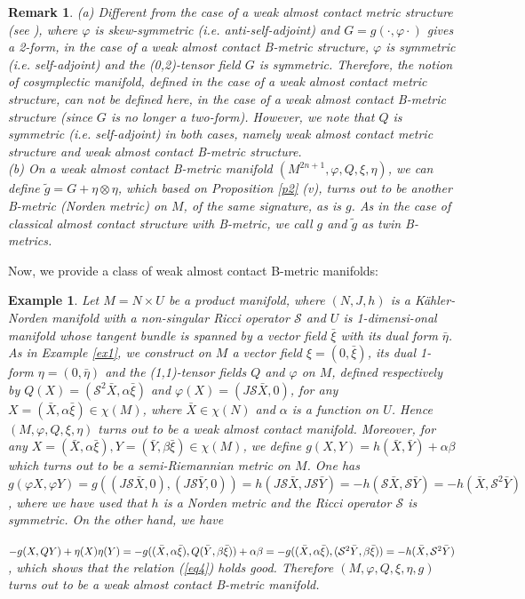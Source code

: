 \documentclass{article}
\newtheorem{example}[theorem]{Example}
\newtheorem{remark}[theorem]{Remark}
\begin{document}
\begin{remark}
(a)	Different from the case of a weak almost contact metric structure (see \cite{Rovenski1}), where $\varphi$ is skew-symmetric (i.e. anti-self-adjoint) and $G = g(·, \varphi·)$ gives a 2-form, in the case of a weak almost contact B-metric structure, $\varphi$  is symmetric (i.e. self-adjoint) and the (0,2)-tensor field $G$ is symmetric. Therefore, the notion of cosymplectic manifold, defined in the case of a weak almost contact metric structure, can not be defined here, in the case of a weak almost contact B-metric structure (since $G$ is no longer a two-form). However, we note that $Q$ is symmetric (i.e. self-adjoint) in both cases, namely weak almost contact metric structure and weak almost contact B-metric structure.\\

(b) On a weak almost contact B-metric manifold $(M^{2n+1},\varphi,Q,\xi,\eta)$, we can define $\tilde{g}=G+\eta\otimes \eta$, which based on Proposition \ref{p2} (v), turns out to be another B-metric (Norden metric) on $M$, of the same signature, as is $g$. As in the case of classical almost contact  structure with B-metric, we call $g$ and $\tilde{g}$ as twin B-metrics.
\end{remark}

\noindent Now, we provide a class of weak almost contact B-metric manifolds:

\begin{example}
Let $M=N\times U$ be a product manifold, where $(N,J,h)$ is a K\"{a}hler-Norden manifold with a non-singular Ricci operator $\mathcal{S}$ and $U$ is 1-dimensi-onal manifold whose tangent bundle is spanned by a vector field ${\bar{\xi}}$ with its dual form $\bar{\eta}$. As in Example \ref{ex1}, we construct on $M$ a vector field $\xi=(0,\bar{\xi})$, its dual 1-form $\eta=(0,\bar{\eta})$ and the (1,1)-tensor fields $Q$ and $\varphi$ on $M$, defined respectively by $Q (X)=(\mathcal{S}^2\bar{X},\alpha\bar{\xi})$ and $\varphi (X)=(J\mathcal{S}\bar{X},0)$, for any $X=(\bar{X},\alpha\bar{\xi})\in\chi(M)$,  where $\bar{X}\in\chi(N)$ and $\alpha$ is a function on $U$. Hence $(M,\varphi,Q,\xi,\eta)$ turns out to be a weak almost contact manifold. Moreover, for any $X=(\bar{X},\alpha\bar{\xi}),Y=(\bar{Y},\beta\bar{\xi})\in\chi(M)$, we define $g(X,Y)=h(\bar{X},\bar{Y})+\alpha\beta$ which turns out to be a semi-Riemannian metric on $M$. One has $g(\varphi X,\varphi Y)=g((J\mathcal{S}\bar{X},0),(J\mathcal{S}\bar{Y},0))=h(J\mathcal{S}\bar{X},J\mathcal{S}\bar{Y})=-h(\mathcal{S}\bar{X},\mathcal{S}\bar{Y})=-h(\bar{X},\mathcal{S}^2\bar{Y})$, where we have used that $h$ is a Norden metric and the Ricci operator $\mathcal{S}$ is symmetric. On the other hand, we have\smallskip

\noindent $-g(X,QY)+\eta(X)\eta(Y)=-g((\bar{X},\alpha\bar{\xi}),Q(\bar{Y},\beta\bar{\xi}))+\alpha\beta=-g((\bar{X},\alpha\bar{\xi}),(\mathcal{S}^2\bar{Y},\beta\bar{\xi}))\\
=-h(\bar{X},\mathcal{S}^2\bar{Y})$, which shows that the relation (\ref{eq4})
 holds good. Therefore \newline $(M,\varphi,Q,\xi,\eta,g)$ turns out to be a weak almost contact B-metric manifold.
\end{example}
\end{document}
